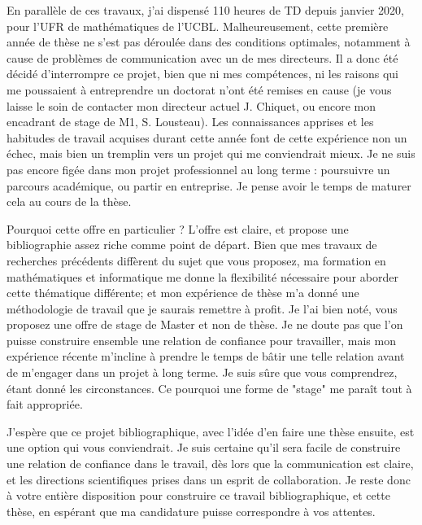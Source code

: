 \documentclass[a4paper,11pt]{article}
\begin{document}
En parallèle de ces travaux, j'ai dispensé %
110 heures de TD depuis janvier 2020, pour l'UFR de mathématiques de l'UCBL. 
Malheureusement, cette première année de thèse ne s'est pas déroulée dans des conditions optimales, notamment à cause de problèmes de communication avec un de mes directeurs. 
%
Il a donc été décidé d'interrompre ce projet, bien que ni mes compétences, ni les raisons qui me poussaient à entreprendre un doctorat n'ont été remises en cause (je vous laisse le soin de contacter mon directeur actuel J. Chiquet, ou encore mon encadrant de stage de M1, S. Lousteau).
%
Les connaissances apprises et les habitudes de travail acquises durant cette année font de cette expérience non un échec, mais bien un tremplin vers un projet qui me conviendrait mieux. 
%
Je ne suis pas encore figée dans mon projet professionnel au long terme : poursuivre un parcours académique, ou partir en entreprise. Je pense avoir le temps de maturer cela au cours de la thèse. 
%


Pourquoi cette offre en particulier ?  L'offre est claire, et propose une bibliographie assez riche comme point de départ. Bien que mes travaux de recherches précédents diffèrent du sujet que vous proposez, ma formation en mathématiques et informatique me donne la flexibilité nécessaire pour aborder cette thématique différente; et mon expérience de thèse m'a donné une méthodologie de travail que je saurais remettre à profit.%
Je l'ai bien noté, vous proposez une offre de stage de Master et non de thèse.
Je ne doute pas que l'on puisse construire ensemble une relation de confiance pour travailler, mais mon expérience récente m'incline à prendre le temps de bâtir une telle relation avant de m'engager dans un projet à long terme. Je suis sûre que vous comprendrez, étant donné les circonstances.
Ce pourquoi une forme de "stage" me paraît tout à fait appropriée.  
%


J'espère que ce projet bibliographique, avec l'idée d'en faire une thèse ensuite, est une option qui vous conviendrait. 
Je suis certaine qu'il sera facile de construire une relation de confiance dans le travail, dès lors que la communication est claire, et les directions scientifiques prises dans un esprit de collaboration. Je reste donc à votre entière disposition pour construire ce travail bibliographique, et cette thèse, en espérant que ma candidature puisse correspondre à vos attentes. \\
\end{document}

